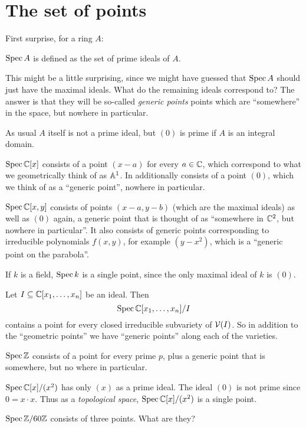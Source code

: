 \section{The set of points}

First surprise, for a ring $A$:
\begin{moral}
	$\operatorname{Spec} A$ is defined as the set of prime ideals of $A$.
\end{moral}

This might be a little surprising, since we might have guessed
that $\operatorname{Spec} A$ should just have the maximal ideals.
What do the remaining ideals correspond to?
The answer is that they will be so-called \emph{generic points}
points which are ``somewhere'' in the space, but nowhere in particular.

\begin{remark}
	As usual $A$ itself is not a prime ideal, but $(0)$
	is prime if $A$ is an integral domain.
\end{remark}

\begin{example}
	\listhack
	\begin{enumerate}[(a)]
		\ii $\operatorname{Spec} \mathbb C[x]$ consists of a point $(x-a)$ for every $a \in \mathbb C$,
		which correspond to what we geometrically think of as $\mathbb A^1$.
		In additionally consists of a point $(0)$,
		which we think of as a ``generic point'', nowhere in particular.

		\ii $\operatorname{Spec} \mathbb C[x,y]$ consists of points $(x-a,y-b)$
		(which are the maximal ideals) as well as $(0)$ again, a generic
		point that is thought of as ``somewhere in $\mathbb C^2$,
		but nowhere in particular''.
		It also consists of generic points corresponding to irreducible
		polynomials $f(x,y)$, for example $(y-x^2)$,
		which is a ``generic point on the parabola''.

		\ii If $k$ is a field, $\operatorname{Spec} k$ is a single point,
		since the only maximal ideal of $k$ is $(0)$.
	\end{enumerate}
\end{example}
\begin{example}
	Let $I \subseteq \mathbb C[x_1, \dots, x_n]$ be an ideal.
	Then \[ \operatorname{Spec} \mathbb C[x_1, \dots, x_n] /I \] contains a
	point for every closed irreducible subvariety of $\mathcal V(I)$.
	So in addition to the ``geometric points'' we have
	``generic points'' along each of the varieties.
\end{example}
\begin{example}
	\listhack
	\begin{enumerate}[(a)]
		\ii $\operatorname{Spec} \mathbb Z$ consists of a point for every prime $p$,
		plus a generic point that is somewhere, but no where in particular.

		\ii $\operatorname{Spec} \mathbb C[x] / (x^2)$ has only $(x)$ as a prime ideal.
		The ideal $(0)$ is not prime since $0 = x \cdot x$.
		Thus as a \emph{topological space},
		$\operatorname{Spec} \mathbb C[x] / (x^2)$ is a single point.
		
		\ii $\operatorname{Spec} \mathbb Z/60\mathbb Z$ consists of three points.
		What are they?
	\end{enumerate}
\end{example}

